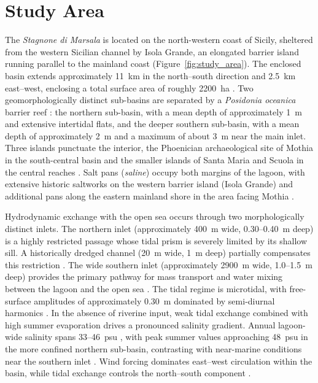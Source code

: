 \section{Study Area}
\label{sec:study_area}

The \emph{Stagnone di Marsala} is located on the north-western coast of
Sicily, sheltered from the western Sicilian channel by Isola Grande, an
elongated barrier island running parallel to the mainland coast
(Figure~\ref{fig:study_area}). The enclosed basin extends approximately 11~km
in the north--south direction and 2.5~km east--west, enclosing a total surface
area of roughly 2200~ha \citep{DeMarchis2012}. Two geomorphologically distinct
sub-basins are separated by a \emph{Posidonia oceanica} barrier reef
\citep{LaLoggia2004}: the northern sub-basin, with a mean depth of
approximately 1~m and extensive intertidal flats, and the deeper southern
sub-basin, with a mean depth of approximately 2~m and a maximum of about 3~m
near the main inlet. Three islands punctuate the interior, the Phoenician
archaeological site of Mothia in the south-central basin and the smaller
islands of Santa Maria and Scuola in the central reaches
\citep{CiraoloDeMarchis2009}. Salt pans (\emph{saline}) occupy both margins of
the lagoon, with extensive historic saltworks on the western barrier island
(Isola Grande) and additional pans along the eastern mainland shore in the
area facing Mothia \citep{Basso2008}.

Hydrodynamic exchange with the open sea occurs through two morphologically
distinct inlets. The northern inlet (approximately 400~m wide, 0.30--0.40~m
deep) is a highly restricted passage whose tidal prism is severely limited by
its shallow sill. A historically dredged channel (20~m wide, 1~m deep)
partially compensates this restriction \citep{CiraoloDeMarchis2009}. The wide
southern inlet (approximately 2900~m wide, 1.0--1.5~m deep) provides the
primary pathway for mass transport and water mixing between the lagoon and the
open sea \citep{CiraoloDeMarchis2009}. The tidal regime is microtidal, with
free-surface amplitudes of approximately 0.30~m dominated by semi-diurnal
harmonics \citep{LaLoggia2004}. In the absence of riverine input, weak tidal
exchange combined with high summer evaporation drives a pronounced salinity
gradient. Annual lagoon-wide salinity spans 33--46~psu \citep{Basso2008}, with
peak summer values approaching 48~psu in the more confined northern sub-basin,
contrasting with near-marine conditions near the southern inlet
\citep{Mancuso2023}. Wind forcing dominates east--west circulation within the
basin, while tidal exchange controls the north--south component
\citep{CiraoloDeMarchis2009, DeMarchis2012}.

